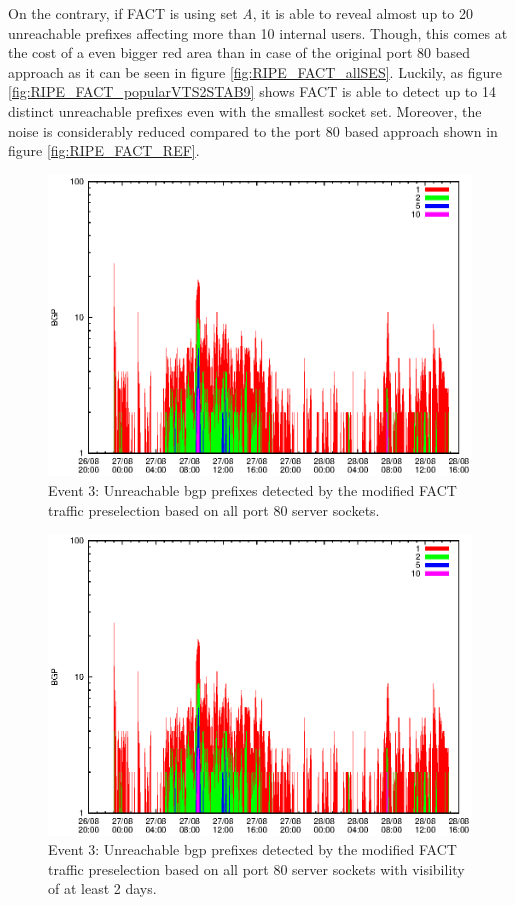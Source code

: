 On the contrary, if \gls{FACT} is using set \emph{A}, it is able to reveal almost up to 20 unreachable prefixes affecting more than 10 internal users. 
Though, this comes at the cost of a even bigger red area than in case of the original port 80 based approach as it can be seen in figure \ref{fig:RIPE_FACT_allSES}. 
Luckily, as figure \ref{fig:RIPE_FACT_popularVTS2STAB9} shows \gls{FACT} is able to detect up to 14 distinct unreachable prefixes even with the smallest socket set. 
Moreover, the noise is considerably reduced compared to the port 80 based approach shown in figure \ref{fig:RIPE_FACT_REF}.
\begin{figure}
	[p] \centering 
	\includegraphics[width=0.75\linewidth]{images/events/2010_08_27/bgp_log_allPort80SES.eps} \caption{Event 3: Unreachable \gls{bgp} prefixes detected by the modified \gls{FACT} traffic preselection based on all port 80 \glspl{server socket}.} 
	\label{fig:RIPE_FACT_allSES80} 
\end{figure}
\begin{figure}
	[p] \centering 
	\includegraphics[width=0.75\linewidth]{images/events/2010_08_27/bgp_log_port80_Set_stab_0_vts_2.eps} \caption{Event 3: Unreachable \gls{bgp} prefixes detected by the modified \gls{FACT} traffic preselection based on all port 80 \glspl{server socket} with visibility of at least 2 days.} 
	\label{fig:RIPE_FACT_allSES80VTS2} 
\end{figure}
